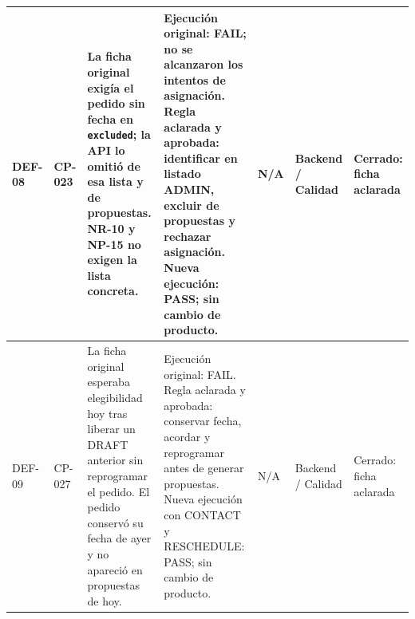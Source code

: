 \begin{center}
\begin{longtable}{|P{1.2cm}|P{1.5cm}|P{3.6cm}|P{3.2cm}|P{0.9cm}|P{1.9cm}|P{1.6cm}|}
DEF-08 & CP-023 & La ficha original exigía el pedido sin fecha en \texttt{excluded}; la API lo omitió de esa lista y de propuestas. NR-10 y NP-15 no exigen la lista concreta. & Ejecución original: FAIL; no se alcanzaron los intentos de asignación. Regla aclarada y aprobada: identificar en listado ADMIN, excluir de propuestas y rechazar asignación. Nueva ejecución: PASS; sin cambio de producto. & N/A & Backend / Calidad & Cerrado: ficha aclarada \\ \hline
DEF-09 & CP-027 & La ficha original esperaba elegibilidad hoy tras liberar un DRAFT anterior sin reprogramar el pedido. El pedido conservó su fecha de ayer y no apareció en propuestas de hoy. & Ejecución original: FAIL. Regla aclarada y aprobada: conservar fecha, acordar y reprogramar antes de generar propuestas. Nueva ejecución con CONTACT y RESCHEDULE: PASS; sin cambio de producto. & N/A & Backend / Calidad & Cerrado: ficha aclarada \\ \hline
\end{longtable}
\end{center}
